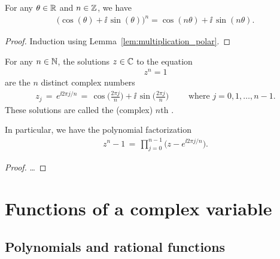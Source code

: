 \begin{theorem}
  \label{lem:de_moivre}
  For any $\theta \in \mathbb{R}$ and $n \in \mathbb{Z}$, we have
  \begin{align*}
    \big( \cos (\theta) + \ii \, \sin (\theta) \big)^n = \cos(n \theta) + \ii \, \sin(n \theta) .
  \end{align*}
\end{theorem}
\begin{proof}
  Induction using Lemma~\ref{lem:multiplication_polar}.
\end{proof}

\begin{lemma}
  \label{lem:roots_of_unity}
  For any $n \in \mathbb{N}$, the solutions $z \in \mathbb{C}$ to the equation
  \begin{align*}
    z^n = 1
  \end{align*}
  are the $n$ distinct complex numbers
  \begin{align*}
    z_j \, = \, e^{\ii 2 \pi j / n}
        \, = \, \cos \Big( \frac{2 \pi j}{n} \Big) + \ii \, \sin \Big( \frac{2 \pi j}{n} \Big)
    \qquad \text{ where } j = 0, 1, \ldots, n-1 .
  \end{align*}
  These solutions are called the (complex) $n$th .

  In particular, we have the polynomial factorization
  \begin{align*}
    z^n - 1 \, = \, \prod_{j=0}^{n-1} \Big( z - e^{\ii 2 \pi j / n} \Big) .
  \end{align*}
\end{lemma}
\begin{proof}
  \ldots
\end{proof}




\section{Functions of a complex variable}

\subsection{Polynomials and rational functions}

